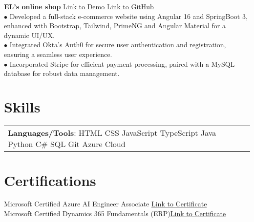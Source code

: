 \documentclass[letterpaper,12pt]{article}
\begin{document}
\textbf{EL's online shop} \hfill \href{https://youtu.be/q0_N9ydf67c}{Link to Demo} \hspace{0.2cm} \href{https://github.com/Zicheng-Li/Angular-ecommerce-frontend}{Link to GitHub}\\
\hspace{0.1cm} $\bullet$ \hspace{0.35em}Developed a full-stack e-commerce website using Angular 16 and SpringBoot 3, enhanced with Bootstrap, Tailwind, PrimeNG and Angular Material for a dynamic UI/UX. \\
\hspace{0.1cm} $\bullet$ \hspace{0.35em}Integrated Okta's Auth0 for secure user authentication and registration, ensuring a seamless user experience. \\ 
\hspace{0.1cm} $\bullet$ \hspace{0.35em}Incorporated Stripe for efficient payment processing, paired with a MySQL database for robust data management.

\section{Skills}
\begin{tabularx}{\linewidth}{@{}l X@{}}
\textbf{Languages/Tools}:  HTML \hspace{0.05cm} CSS \hspace{0.05cm} JavaScript \hspace{0.05cm} TypeScript \hspace{0.05cm} Java \hspace{0.05cm} Python \hspace{0.05cm} C\# \hspace{0.05cm} SQL \hspace{0.05cm} Git \hspace{0.19cm}Azure Cloud 
\end{tabularx}

\section{Certifications}
Microsoft Certified Azure AI Engineer Associate \hfill \href{https://learn.microsoft.com/en-us/users/zichengli-4388/credentials/8f80de9e7944a10}{Link to Certificate}\\
Microsoft Certified Dynamics 365 Fundamentals (ERP)\hfill \href{https://learn.microsoft.com/en-us/users/zichengli-4388/credentials/5d28421aefedb4ec}{Link to Certificate}
\end{document}
